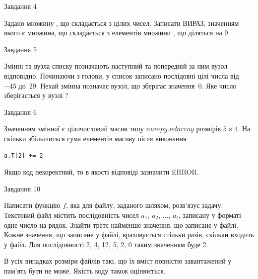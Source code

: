 \documentclass[12pt, ukrainian]{article}
\begin{document}
{               
{\begin{center}Завдання {4}\end{center}}
\vspace{-6mm}
Задано множину , що складається з цілих чисел. Записати ВИРАЗ, значенням якого є множина, що складається  з елементів множини , що діляться на 9.\par

\vspace{10mm}
               
{\begin{center}Завдання {5}\end{center}}
\vspace{-6mm}
Змінні  та  вузла списку позначають наступний та попередній за ним вузол відповідно. Починаючи з голови, у список записано послідовні цілі числа від~$-45$ до~$29$. Нехай змінна  позначає вузол, що зберігає значення~$0$.
Яке число зберігається у вузлі  ?\par

               
{\begin{center}Завдання {6}\end{center}}
\vspace{-6mm}
Значенням змінної  є цілочисловий масив типу $numpy.ndarray$ розмірів $5{\times}4$. На скільки збільшиться сума елементів масиву  після виконання
\begin{verbatim}
a.T[2] += 2
\end{verbatim}


Якщо код некоректний, то в якості відповіді зазначити ERROR.\par

               
{\begin{center}Завдання {10}\end{center}}
\vspace{-6mm}

Написати функцію $f$, яка для файлу, заданого шляхом, розв’язує задачу:\\ Текстовий файл містить послідовність чисел $a_1$, $a_2$, $\ldots$, $a_t$, записану у форматі одне число на рядок. Знайти третє найменше значення, що записане у файлі. Кожне значення, що записане у файлі, враховується стільки разів, скільки входить у файл. Для послідовності 2, 4, 12, 5, 2, 0 таким значенням буде 2.

В усіх випадках розміри файлів такі, що їх вміст повністю завантажений у пам'ять бути не може. Якість коду також оцінюється.



}
\end{document}
